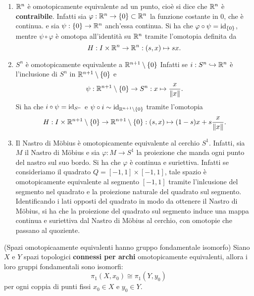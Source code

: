 \documentclass[]{article}
\begin{document}
\begin{example} \nl
    \begin{enumerate} 
        \item $\mathbb{R}^n$ \`e omotopicamente equivalente ad un punto, cio\`e si dice che $\mathbb{R}^n$ \`e \textbf{contraibile}.
            Infatti sia $\varphi: \mathbb{R}^n \to \left\{ 0 \right\} \subset \mathbb{R}^n$ la funzione costante in $0$, che è continua.
            e sia $\psi: \left\{ 0 \right\} \to \mathbb{R}^n$ anch'essa continua. \nl
            Si ha che $\varphi \circ \psi = \mathrm{id}_{\left\{ 0 \right\}}$, mentre $\psi \circ \varphi$ è omotopa all'identità su $\mathbb{R}^n$ tramite l'omotopia
            definita da
            \[
                H: I \times \mathbb{R}^n \to \mathbb{R}^n: (s,x) \mapsto s x.
            \]
        \item $S^n$ \`e omotopicamente equivalente a $\mathbb{R}^{n+1} \setminus{\left\{ 0 \right\}}$ \nl
        Infatti se $i: S^n \hookrightarrow \mathbb{R}^n$ \`e l'inclusione di $S^n$ in $\mathbb{R}^{n+1} \setminus{\left\{ 0 \right\}}$ e
        \[  
            \psi: \mathbb{R}^{n+1} \setminus{\left\{ 0 \right\}} \to S^n: x \mapsto \frac{x}{\left\| x \right\|}.
        \]
        Si ha che $i \circ \psi = \mathrm{id}_{S^n}$ e $\psi \circ i \sim \mathrm{id}_{\mathbb{R}^{n+1} \setminus{\left\{ 0 \right\}}}$ tramite l'omotopia
        \[
            H: I \times \mathbb{R}^{n+1} \setminus{\left\{ 0 \right\}} \to \mathbb{R}^{n+1} \setminus{\left\{ 0 \right\}}: (s,x) \mapsto (1-s)x + s\frac{x}{\left\| x \right\|}.
        \]
        \item Il Nastro di Möbius \`e omotopicamente equivalente al cerchio $S^1$. \nl
            Infatti, sia $M$ il Nastro di Möbius e sia $\varphi: M \to S^1$ la proiezione che manda ogni punto del nastro sul suo bordo.
            Si ha che $\varphi$ è continua e suriettiva. \nl
            Infatti se consideriamo il quadrato $Q = [-1,1] \times [-1,1]$, tale spazio \`e omotopicamente equivalente al segmento
            $[-1,1]$ tramite l'inlcusione del segmento nel quadrato e la proiezione naturale del quadrato sul segmento.
            Identificando i lati opposti del quadrato in modo da ottenere il Nastro di Möbius, si ha che
            la proiezione del quadrato sul segmento induce una mappa continua e suriettiva dal Nastro di Möbius al cerchio, con omotopie 
            che passano al quoziente.
        \end{enumerate}
\end{example}

\begin{theorem} (Spazi omotopicaamente equivalenti hanno gruppo fondamentale isomorfo) \nl
    Siano $X$ e $Y$ spazi topologici \textbf{connessi per archi} omotopicamente equivalenti, allora i loro gruppi fondamentali sono isomorfi:
    \[
        \pi_1(X, x_0) \cong \pi_1(Y, y_0)
    \]
    per ogni coppia di punti fissi $x_0 \in X$ e $y_0 \in Y$.
\end{theorem}
\end{document}
